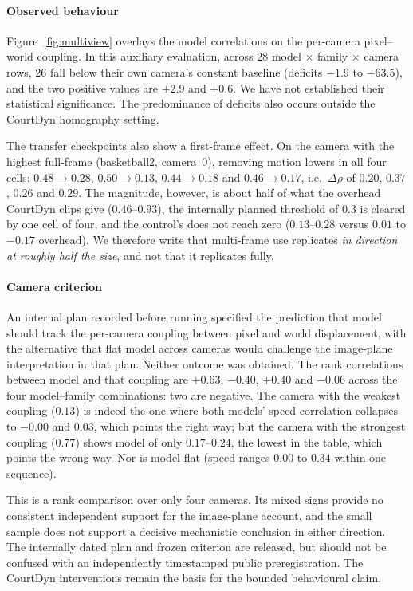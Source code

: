 \paragraph{Observed behaviour} Figure~\ref{fig:multiview} overlays the model
correlations on the per-camera pixel--world coupling. In this auxiliary
evaluation, across 28 model $\times$ family $\times$ camera rows, $26$ fall below
their own camera's constant baseline (deficits $-1.9$ to $-63.5$), and the two positive values are $+2.9$ and $+0.6$. We have not established
their statistical significance. The predominance of deficits also occurs
outside the CourtDyn homography setting.

The transfer checkpoints also show a first-frame effect. On the camera with the
highest full-frame \rhosp{} (basketball2, camera~0), removing motion lowers
\rhosp{} in all four cells: $0.48 \to 0.28$, $0.50 \to 0.13$, $0.44 \to 0.18$
and $0.46 \to 0.17$, i.e.\ $\Delta\rho$ of $0.20$, $0.37$, $0.26$ and $0.29$.
The magnitude, however, is about half of what the overhead CourtDyn clips give
($0.46$--$0.93$), the internally planned threshold of $0.3$ is cleared by one cell
of four, and the control's \rhosp{} does not reach zero ($0.13$--$0.28$ versus
$0.01$ to $-0.17$ overhead). We therefore write that multi-frame use replicates
\emph{in direction at roughly half the size}, and not that it replicates fully.

\paragraph{Camera criterion} An internal plan recorded before running specified the
prediction that model \rhosp{} should track the per-camera coupling between
pixel and world displacement, with the alternative that flat model \rhosp{}
across cameras would challenge the image-plane interpretation in that plan.
Neither outcome was obtained. The rank correlations between model \rhosp{} and that coupling are
$+0.63$, $-0.40$, $+0.40$ and $-0.06$ across the four model--family
combinations: two are negative. The camera with the weakest coupling ($0.13$)
is indeed the one where both models' speed correlation collapses to $-0.00$ and
$0.03$, which points the right way; but the camera with the strongest coupling
($0.77$) shows model \rhosp{} of only $0.17$--$0.24$, the lowest in the table,
which points the wrong way. Nor is model \rhosp{} flat (speed ranges $0.00$ to
$0.34$ within one sequence).

This is a rank comparison over only four cameras. Its mixed signs provide
no consistent independent support for the image-plane account, and the small
sample does not support a decisive mechanistic conclusion in either direction.
The internally dated plan and frozen criterion are released, but should not be
confused with an independently timestamped public preregistration. The
CourtDyn interventions remain the basis for the bounded behavioural claim.

